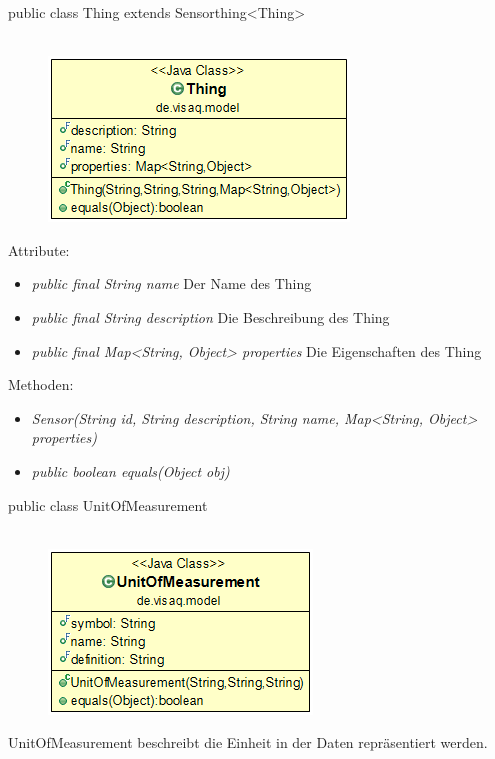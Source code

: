 public class Thing extends Sensorthing<Thing>
\\\\
\begin{minipage}{0.3\textwidth}
	\begin{figure}[H]
		\includegraphics[scale = 0.5
		]{media/frontend/model/ThingClass.png}
	\end{figure}
\end{minipage} \hfill
\begin{minipage}{0.6\textwidth}
\end{minipage}

Attribute:
\begin{itemize} 
	\item \emph{public final String name} Der Name des Thing
	\item \emph{public final String description} Die Beschreibung des Thing
	\item \emph{public final Map<String, Object> properties} Die Eigenschaften des Thing
\end{itemize}
Methoden:
\begin{itemize} 
	\item \emph{Sensor(String id, String description, String name, Map<String, Object> properties)} 
	\item \emph{public boolean equals(Object obj)} 
\end{itemize}

public class UnitOfMeasurement 
\\\\
\begin{minipage}{0.3\textwidth}
	\begin{figure}[H]
		\includegraphics[scale = 0.5
		]{media/frontend/model/UnitOfMeasurementClass.png} 
	\end{figure}
\end{minipage} \hfill
\begin{minipage}{0.6\textwidth}
	 UnitOfMeasurement beschreibt die Einheit in der Daten repräsentiert werden.
\end{minipage}

